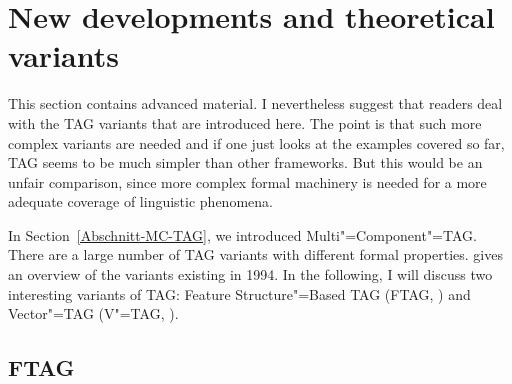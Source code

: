 \section{New developments and theoretical variants}

This section contains advanced material. I nevertheless suggest that readers deal with the TAG
variants that are introduced here. The point is that such more complex variants are needed and if
one just looks at the examples covered so far, TAG seems to be much simpler than other
frameworks. But this would be an unfair comparison, since more complex formal machinery is needed
for a more adequate coverage of linguistic phenomena.

In Section~\ref{Abschnitt-MC-TAG}, we introduced Multi"=Component"=TAG. There are a large number of TAG variants with different formal properties.
\citet[\page
]{Rambow94a} gives an overview of the variants existing in 1994. In the following, I will discuss
two interesting variants of TAG: Feature Structure"=Based TAG (FTAG\indexftag, \citealp{VSJ88a}) and
Vector"=TAG (V"=TAG, \citealp{Rambow94a}). 

\subsection{FTAG}

